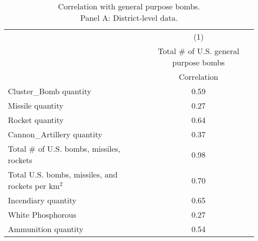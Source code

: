 \begin{table}[htbp]\centering
\def\sym#1{\ifmmode^{#1}\else\(^{#1}\)\fi}
\caption{Correlation with general purpose bombs. \\ Panel A: District-level data.}
\begin{tabular}{l*{1}{c}}
\toprule
                &\multicolumn{1}{c}{(1)}\\
                &\multicolumn{1}{c}{Total # of U.S. general purpose bombs}\\
                &Correlation\\
\midrule
Cluster\_Bomb quantity&     0.59\\
Missile quantity&     0.27\\
Rocket quantity &     0.64\\
Cannon\_Artillery quantity&     0.37\\
Total # of U.S. bombs, missiles, rockets&     0.98\\
Total U.S. bombs, missiles, and rockets per km$^2$&     0.70\\
Incendiary quantity&     0.65\\
White Phosphorous&     0.27\\
Ammunition quantity&     0.54\\
\bottomrule
\end{tabular}
\end{table}

